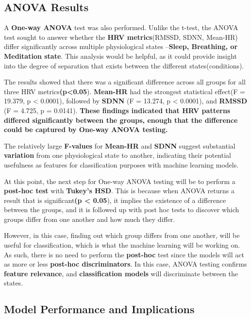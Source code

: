 \documentclass[
  11pt,
]{ieee}
\begin{document}
\subsection{ANOVA Results}\label{anova-results}

\vspace{0.8em}

A \textbf{One-way ANOVA} test was also performed. Unlike the t-test, the
ANOVA test sought to answer whether the \textbf{HRV metrics}(RMSSD,
SDNN, Mean-HR) differ significantly across multiple physiological states
--\textbf{Sleep, Breathing, or Meditation state}. This analysis would be
helpful, as it could provide insight into the degree of separation that
exists between the different states(conditions).

The results showed that there was a significant difference across all
groups for all three HRV metrics\textbf{(p\textless0.05}).
\textbf{Mean-HR} had the strongest statistical effect(F = 19.379, p
\textless{} 0.0001), followed by \textbf{SDNN} (F = 13.274, p
\textless{} 0.0001), and \textbf{RMSSD} (F = 4.725, p = 0.0141).
\textbf{These findings indicated that HRV patterns differed
significantly between the groups, enough that the difference could be
captured by One-way ANOVA testing.}

The relatively large \textbf{F-values} for \textbf{Mean-HR} and
\textbf{SDNN} suggest substantial \textbf{variation} from one
physiological state to another, indicating their potential usefulness as
features for classification purposes with machine learning models.

At this point, the next step for One-way ANOVA testing will be to
perform a \textbf{post-hoc test} with \textbf{Tukey's HSD}. This is
because when ANOVA returns a result that is significant\textbf{(p
\textless{} 0.05}), it implies the existence of a difference between the
groups, and it is followed up with post hoc tests to discover which
groups differ from one another and how much they differ.

However, in this case, finding out which group differs from one another,
will be useful for classification, which is what the machine learning
will be working on. As such, there is no need to perform the
\textbf{post-hoc} test since the models will act as more or less
\textbf{post-hoc discriminators}. In this case, ANOVA testing confirms
\textbf{feature relevance}, and \textbf{classification models} will
discriminate between the states.

\subsection{Model Performance and
Implications}\label{model-performance-and-implications}
\end{document}

